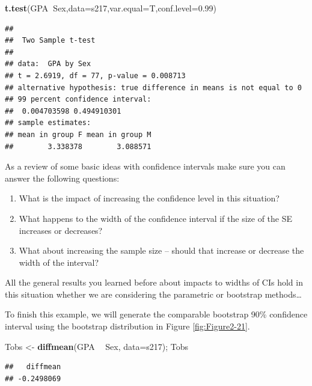 \documentclass[]{book}
\newenvironment{Shaded}{\begin{snugshade}}{\end{snugshade}}
\newcommand{\KeywordTok}[1]{\textcolor[rgb]{0.13,0.29,0.53}{\textbf{#1}}}
\newcommand{\DataTypeTok}[1]{\textcolor[rgb]{0.13,0.29,0.53}{#1}}
\newcommand{\FloatTok}[1]{\textcolor[rgb]{0.00,0.00,0.81}{#1}}
\newcommand{\StringTok}[1]{\textcolor[rgb]{0.31,0.60,0.02}{#1}}
\newcommand{\OperatorTok}[1]{\textcolor[rgb]{0.81,0.36,0.00}{\textbf{#1}}}
\newcommand{\NormalTok}[1]{#1}
\begin{document}
\begin{Shaded}
\begin{Highlighting}[]
\KeywordTok{t.test}\NormalTok{(GPA}\OperatorTok{~}\NormalTok{Sex,}\DataTypeTok{data=}\NormalTok{s217,}\DataTypeTok{var.equal=}\NormalTok{T,}\DataTypeTok{conf.level=}\FloatTok{0.99}\NormalTok{)}
\end{Highlighting}
\end{Shaded}

\begin{verbatim}
## 
##  Two Sample t-test
## 
## data:  GPA by Sex
## t = 2.6919, df = 77, p-value = 0.008713
## alternative hypothesis: true difference in means is not equal to 0
## 99 percent confidence interval:
##  0.004703598 0.494910301
## sample estimates:
## mean in group F mean in group M 
##        3.338378        3.088571
\end{verbatim}

As a review of some basic ideas with confidence intervals make sure you
can answer the following questions:

\begin{enumerate}
\def\labelenumi{\arabic{enumi}.}
\item
  What is the impact of increasing the confidence level in this
  situation?
\item
  What happens to the width of the confidence interval if the size of
  the SE increases or decreases?
\item
  What about increasing the sample size -- should that increase or
  decrease the width of the interval?
\end{enumerate}

All the general results you learned before about impacts to widths of
CIs hold in this situation whether we are considering the parametric or
bootstrap methods\ldots{}

To finish this example, we will generate the comparable bootstrap 90\%
confidence interval using the bootstrap distribution in Figure
\ref{fig:Figure2-21}.

\begin{Shaded}
\begin{Highlighting}[]
\NormalTok{Tobs <-}\StringTok{ }\KeywordTok{diffmean}\NormalTok{(GPA }\OperatorTok{~}\StringTok{ }\NormalTok{Sex, }\DataTypeTok{data=}\NormalTok{s217); Tobs}
\end{Highlighting}
\end{Shaded}

\begin{verbatim}
##   diffmean 
## -0.2498069
\end{verbatim}
\end{document}
